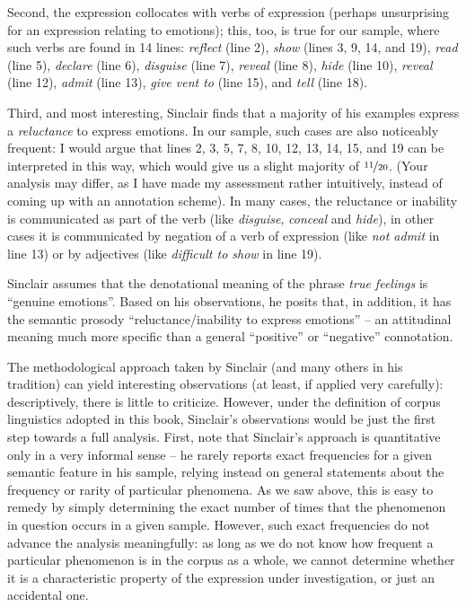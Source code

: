 Second, the expression collocates  with verbs  of expression (perhaps unsurprising for an expression relating to emotions);  this, too, is true for our sample, where such verbs are found in 14 lines: \textit{reflect} (line 2), \textit{show} (lines 3, 9, 14, and 19), \textit{read} (line 5), \textit{declare} (line 6), \textit{disguise} (line 7), \textit{reveal} (line 8), \textit{hide} (line 10), \textit{reveal} (line 12), \textit{admit} (line 13), \textit{give vent to} (line 15), and \textit{tell} (line 18).

Third, and most interesting, Sinclair finds that a majority of his examples express a \textit{reluctance} to express emotions.  In our sample, such cases are also noticeably frequent: I would argue that lines 2, 3, 5, 7, 8, 10, 12, 13, 14, 15, and 19 can be interpreted in this way, which would give us a slight majority of $\nicefrac{11}{20}$. (Your analysis may differ, as I have made my assessment rather intuitively,  instead of coming up with an annotation  scheme). In many cases, the reluctance or inability is communicated as part of the verb  (like \textit{disguise}, \textit{conceal} and \textit{hide}), in other cases it is communicated by negation  of a verb of expression (like \textit{not admit} in line 13) or by adjectives  (like \textit{difficult to show} in line 19).

Sinclair assumes that the denotational meaning  of the phrase \textit{true feelings}  is ``genuine emotions''. Based on his observations, he posits that, in addition, it has the semantic prosody ``reluctance\slash inability to express emotions'' -- an attitudinal meaning much more specific than a general ``positive'' or ``negative''  connotation.

The methodological approach taken by Sinclair (and many others in his tradition) can yield interesting observations (at least, if applied very carefully): descriptively,  there is little to criticize. However, under the definition of corpus linguistics adopted in this book, Sinclair's observations would be just the first step towards a full analysis. First, note that Sinclair's approach is quantitative  only in a very informal sense -- he rarely reports exact frequencies for a given semantic  feature in his sample, relying instead on general statements about the frequency or rarity of particular phenomena. As we saw above, this is easy to remedy by simply determining the exact number of times that the phenomenon in question occurs in a given sample. However, such exact frequencies do not advance the analysis meaningfully: as long as we do not know how frequent a particular phenomenon is in the corpus as a whole, we cannot determine whether it is a characteristic property of the expression under investigation, or just an accidental one.

